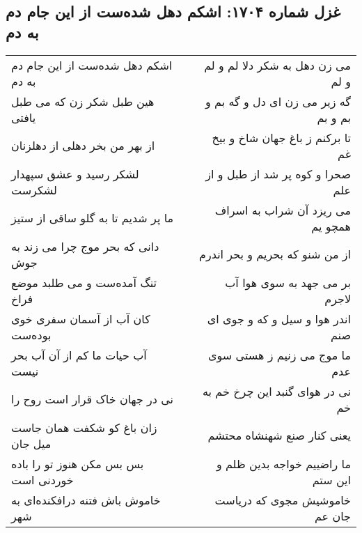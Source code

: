 \begin{center}
\section*{غزل شماره ۱۷۰۴: اشکم دهل شده‌ست از این جام دم به دم}
\label{sec:1704}
\begin{longtable}{l p{0.5cm} r}
اشکم دهل شده‌ست از این جام دم به دم
&&
می زن دهل به شکر دلا لم و لم و لم
\\
هین طبل شکر زن که می طبل یافتی
&&
گه زیر می زن ای دل و گه بم و بم و بم
\\
از بهر من بخر دهلی از دهلزنان
&&
تا برکنم ز باغ جهان شاخ و بیخ غم
\\
لشکر رسید و عشق سپهدار لشکرست
&&
صحرا و کوه پر شد از طبل و از علم
\\
ما پر شدیم تا به گلو ساقی از ستیز
&&
می ریزد آن شراب به اسراف همچو یم
\\
دانی که بحر موج چرا می زند به جوش
&&
از من شنو که بحریم و بحر اندرم
\\
تنگ آمده‌ست و می طلبد موضع فراخ
&&
بر می جهد به سوی هوا آب لاجرم
\\
کان آب از آسمان سفری خوی بوده‌ست
&&
اندر هوا و سیل و که و جوی ای صنم
\\
آب حیات ما کم از آن آب بحر نیست
&&
ما موج می زنیم ز هستی سوی عدم
\\
نی در جهان خاک قرار است روح را
&&
نی در هوای گنبد این چرخ خم به خم
\\
زان باغ کو شکفت همان جاست میل جان
&&
یعنی کنار صنع شهنشاه محتشم
\\
بس بس مکن هنوز تو را باده خوردنی است
&&
ما راضییم خواجه بدین ظلم و این ستم
\\
خاموش باش فتنه درافکنده‌ای به شهر
&&
خاموشیش مجوی که دریاست جان عم
\\
\end{longtable}
\end{center}
